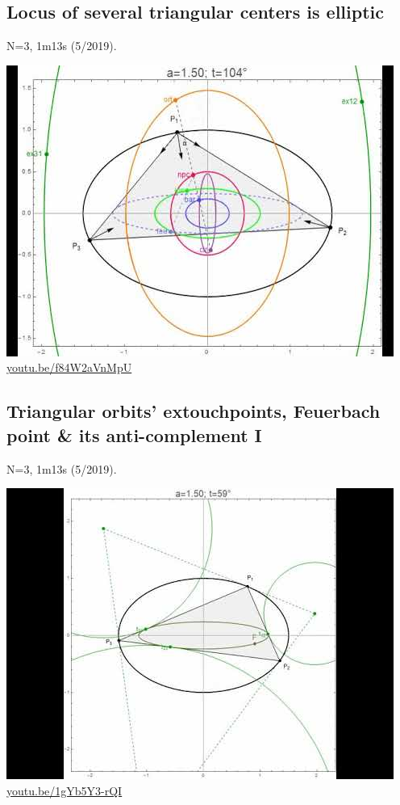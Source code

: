 \documentclass[12pt]{amsart}
\begin{document}
\subsection{Locus of several triangular centers is elliptic}
\label{vid:f84W2aVnMpU}
\noindent N=3, 1m13s (5/2019). 
\begin{center}\includegraphics[width=.5\textwidth]{pics/f84W2aVnMpU.jpg} \\ 
\href{https://youtu.be/f84W2aVnMpU}{\url{youtu.be/f84W2aVnMpU}}\end{center}
% 

\subsection{Triangular orbits' extouchpoints, Feuerbach point \& its anti-complement I}
\label{vid:1gYb5Y3-rQI}
\noindent N=3, 1m13s (5/2019). 
\begin{center}\includegraphics[width=.5\textwidth]{pics/1gYb5Y3-rQI.jpg} \\ 
\href{https://youtu.be/1gYb5Y3-rQI}{\url{youtu.be/1gYb5Y3-rQI}}\end{center}
% 
\end{document}
